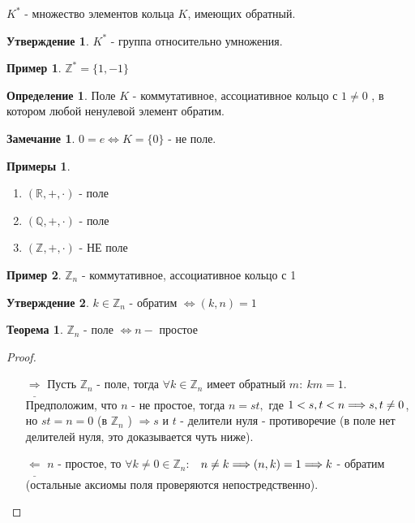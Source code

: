 \documentclass[a4paper, 12pt]{article}
\newcommand{\R}{\mathbb R}
\newcommand{\Q}{\mathbb Q}
\newcommand{\Z}{\mathbb Z}
\newcommand\tab[1][.5cm]{\hspace*{#1}}
\theoremstyle{definition}
\newtheorem*{definition}{Определение}
\newtheorem*{theorem}{Теорема}
\newtheorem*{subtheorem}{Утверждение}
\newtheorem*{remark}{Замечание}
\newtheorem*{example}{Примеры}
\newtheorem*{example1}{Пример}
\begin{document}
  $K^*$ - множество элементов кольца $K$, имеющих обратный. 
  \begin{subtheorem}
    $K^*$ - группа относительно умножения. 
  \end{subtheorem}  
  \begin{example1}
    $\Z^* = \{1, -1\}$
  \end{example1}
  \begin{definition}
    Поле $K$ - коммутативное, ассоциативное кольцо с $1 \neq 0$ , в котором любой ненулевой элемент обратим.
  \end{definition} 
  \begin{remark}
    $0 = e \Longleftrightarrow K = \{0\}$ - не поле.
  \end{remark} 
  \begin{example}\tab
    \begin{enumerate}
      \item $(\R, +, \cdot)$ - поле
      \item $(\Q, +, \cdot)$ - поле
      \item $(\Z, +, \cdot)$ - НЕ поле   
    \end{enumerate}
  \end{example}
  \begin{example1}
    $\Z_n$ - коммутативное, ассоциативное кольцо с 1
  \end{example1}
  \begin{subtheorem}
    $k \in \Z_n$ - обратим $\Longleftrightarrow (k, n) = 1$  
  \end{subtheorem} 
  \begin{theorem}
    $\Z_n$ - поле $\Longleftrightarrow n - $ простое 
  \end{theorem} 
  \begin{proof}\tab
    \begin{itemize}
      \item[$\underline{\Longrightarrow}$] Пусть $\Z_n$ - поле, тогда $\forall k \in \Z_n$ имеет обратный $m : \ km=1$.\\ Предположим, что $n$ - не простое, тогда $n = st, $ где $1<s, t<n \\ \Longrightarrow s, t \neq 0$, но $st=n=0$ (в $\Z_n$ ) $\Longrightarrow s$ и $t$ - делители нуля - противоречие (в поле нет делителей нуля, это доказывается чуть ниже).
      \item[$\underline{\Longleftarrow}$] $n$ - простое, то $\forall k \neq 0 \in \Z_n:$ \ $n \neq k \Longrightarrow (n, k) = 1 \\ \Longrightarrow k$ - обратим (остальные аксиомы поля проверяются непостредственно).  
    \end{itemize}
  \end{proof}
\end{document}
